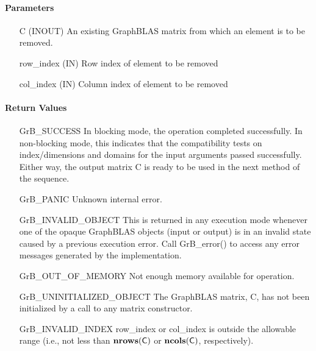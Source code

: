 \paragraph{Parameters}

\begin{itemize}[leftmargin=1.1in]
    \item[{\sf C}]   ({\sf INOUT}) An existing GraphBLAS matrix from which an 
    element is to be removed.

    \item[{\sf row\_index}] ({\sf IN}) Row index of element to be removed
    \item[{\sf col\_index}] ({\sf IN}) Column index of element to be removed
\end{itemize}

\paragraph{Return Values}

\begin{itemize}[leftmargin=2.1in]
    \item[{\sf GrB\_SUCCESS}]         In blocking mode, the operation completed
    successfully. In non-blocking mode, this indicates that the compatibility 
    tests on index/dimensions and domains for the input arguments passed successfully. 
    Either way, the output matrix {\sf C} is ready to be used in the next method of 
    the sequence.

    \item[{\sf GrB\_PANIC}]   Unknown internal error.
    
    \item[{\sf GrB\_INVALID\_OBJECT}] This is returned in any execution mode 
    whenever one of the opaque GraphBLAS objects (input or output) is in an invalid 
    state caused by a previous execution error.  Call {\sf GrB\_error()} to access 
    any error messages generated by the implementation.

    \item[{\sf GrB\_OUT\_OF\_MEMORY}]  Not enough memory available for operation.
    
    \item[{\sf GrB\_UNINITIALIZED\_OBJECT}]  The GraphBLAS matrix, {\sf C}, has 
    not been initialized by a call to any matrix constructor.

    \item[{\sf GrB\_INVALID\_INDEX}]  {\sf row\_index} or {\sf col\_index} is 
    outside the allowable range (i.e., not less than $\mathbf{nrows}({\sf C})$ or
    $\mathbf{ncols}({\sf C})$, respectively).
\end{itemize}

